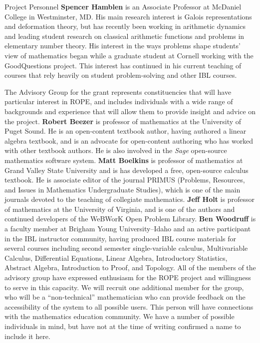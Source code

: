 \documentclass[11pt]{article}
\begin{document}
\begin{section}{Project Personnel}
\textbf{Spencer Hamblen} is an Associate Professor at McDaniel College in
Westminster, MD.  His main research interest is Galois representations and
deformation theory, but has recently been working in arithmetic dynamics
and leading student research on classical arithmetic functions and problems 
in elementary number theory.  His interest in the ways problems shape 
students' view of mathematics began while a graduate student at Cornell 
working with the GoodQuestions project.  This interest has continued in his 
current teaching of courses that rely heavily on student problem-solving 
and other IBL courses.

The Advisory Group for the grant represents constituencies that will have
particular interest in ROPE, and includes individuals with a wide range of
backgrounds and experience that will allow them to provide insight and
advice on the project.  \textbf{Robert Beezer} is professor of mathematics
at the University of Puget Sound.  He is an open-content textbook author,
having authored a linear algebra textbook, and is an advocate for
open-content authoring who has worked with other textbook authors.  He is
also involved in the \emph{Sage} open-source mathematics software system.
\textbf{Matt Boelkins} is professor of mathematics at Grand Valley State
University and is has developed a free, open-source calculus textbook.  He is
associate editor of the journal PRIMUS (Problems, Resources, and Issues
in Mathematics Undergraduate Studies), which is one of the main journals
devoted to the teaching of collegiate mathematics.  
\textbf{Jeff Holt} is professor of mathematics at the University of
Virginia, and is one of the authors and continued developers of the
WeBWorK Open Problem Library.
\textbf{Ben Woodruff} is a faculty member at Brigham Young
University--Idaho and an active participant in the IBL instructor
community, having produced IBL course materials for several courses including second semester single-variable calculus, Multivariable Calculus, Differential Equations, Linear Algebra, Introductory Statistics, Abstract Algebra, Introduction to Proof, and Topology.
All of the members of the advisory group have expressed enthusiasm for the
ROPE project and willingness to serve in this capacity.  We will recruit
one additional member for the group, who will be a ``non-technical''
mathematician who can provide feedback on the accessibility of the system
to all possible users.  This person will have connections with the
mathematics education community.  We have a number of possible individuals 
in mind, but have not at the time of writing confirmed a name to include
it here.


\end{section}
\end{document}
